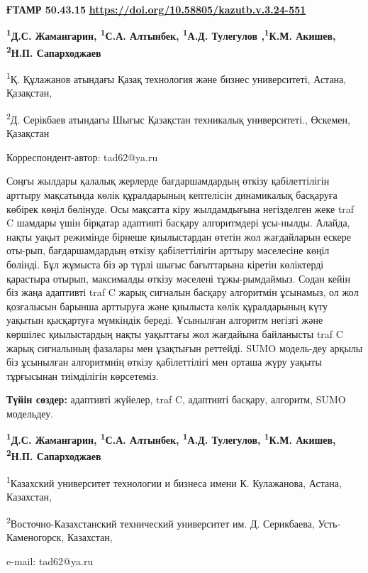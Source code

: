 \newpage
{\bfseries ҒТАМР 50.43.15}
\hfill {\bfseries \href{https://doi.org/10.58805/kazutb.v.3.24-551}{https://doi.org/10.58805/kazutb.v.3.24-551}}


\begin{center}

{\bfseries \textsuperscript{1}Д.С. Жамангарин, \textsuperscript{1}С.А.
Алтынбек, \textsuperscript{1}А.Д. Тулегулов \envelope,\bfseries \textsuperscript{1}К.М. Акишев, \textsuperscript{2}Н.П.
Сапарходжаев}

\textsuperscript{1}Қ. Құлажанов атындағы Қазақ технология және бизнес
университеті, Астана, Қазақстан,

\textsuperscript{2}Д. Серікбаев атындағы Шығыс Қазақстан техникалық
университеті., Өскемен, Қазақстан
\end{center}
\envelope Корреспондент-автор: tad62@ya.ru\vspace{0.5cm}

Соңғы жылдары қалалық жерлерде бағдаршамдардың өткізу қабілеттілігін
арттыру мақсатында көлік құралдарының кептелісін динамикалық басқаруға
көбірек көңіл бөлінуде. Осы мақсатта кіру жылдамдығына негізделген жеке
traf C шамдары үшін бірқатар адаптивті басқару алгоритмдері ұсы-нылды.
Алайда, нақты уақыт режимінде бірнеше қиылыстардан өтетін жол
жағдайларын ескере оты-рып, бағдаршамдардың өткізу қабілеттілігін арттыру
мәселесіне көңіл бөлінді. Бұл жұмыста біз әр түрлі шығыс бағыттарына
кіретін көліктерді қарастыра отырып, максималды өткізу мәселені
тұжы-рымдаймыз. Содан кейін біз жаңа адаптивті traf C жарық сигналын
басқару алгоритмін ұсынамыз, ол жол қозғалысын барынша арттыруға және
қиылыста көлік құралдарының күту уақытын қысқартуға мүмкіндік береді.
Ұсынылған алгоритм негізгі және көршілес қиылыстардың нақты уақыттағы
жол жағдайына байланысты traf C жарық сигналының фазалары мен ұзақтығын
реттейді. SUMO модель-деу арқылы біз ұсынылған алгоритмнің өткізу
қабілеттілігі мен орташа жүру уақыты тұрғысынан тиімділігін көрсетеміз.

{\bfseries Түйін сөздер:} адаптивті жүйелер, traf C, адаптивті басқару,
алгоритм, SUMO модельдеу.



\begin{center}
{\bfseries \textsuperscript{1}Д.С. Жамангарин, \textsuperscript{1}С.А.
Алтынбек, \textsuperscript{1}А.Д. Тулегулов\envelope , \textsuperscript{1}К.М. Акишев, \textsuperscript{2}Н.П. Сапарходжаев}

\textsuperscript{1}Казахский университет технологии и бизнеса имени К.
Кулажанова, Астана, Казахстан,

\textsuperscript{2}Восточно-Казахстанский технический университет им. Д.
Серикбаева, Усть-Каменогорск, Казахстан,

e-mail: tad62@ya.ru
\end{center}

